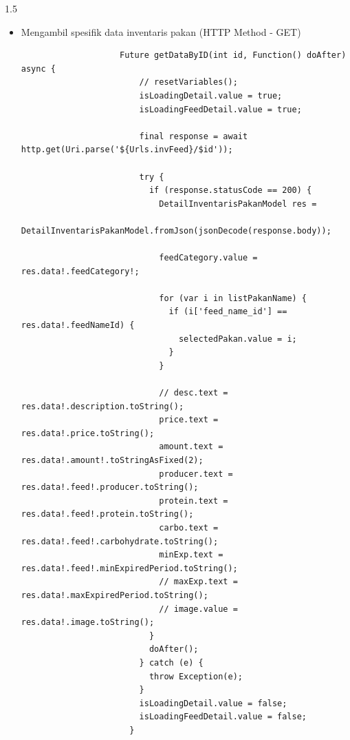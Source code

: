 \begin{spacing}{1.5}
\begin{enumerate}
\begin{enumerate}
\begin{itemize}
\begin{lstlisting}
						try {
						if (response.statusCode == 200) {
							InventarisPakanModel res =
								InventarisPakanModel.fromJson(jsonDecode(response.body));

							feedList.value = res;

							for (var i in feedList.value.data!) {
							selectedFeedList.add({
								'id': i.idInt,
								'feed_id': i.sId,
								'feed_name': i.brandName,
							});

							selectedFeedName.value = selectedFeedList[0];
							}

							inspect(feedList.value.data);

							doAfter();
						}
						} catch (e) {
						throw Exception(e);
						}
						isLoadingPage.value = false;
					}
				\end{lstlisting}

				\item Mengambil spesifik data inventaris pakan (HTTP Method - GET)
				
				\begin{lstlisting}
					Future getDataByID(int id, Function() doAfter) async {
						// resetVariables();
						isLoadingDetail.value = true;
						isLoadingFeedDetail.value = true;
					
						final response = await http.get(Uri.parse('${Urls.invFeed}/$id'));
					
						try {
						  if (response.statusCode == 200) {
							DetailInventarisPakanModel res =
								DetailInventarisPakanModel.fromJson(jsonDecode(response.body));
					
							feedCategory.value = res.data!.feedCategory!;
					
							for (var i in listPakanName) {
							  if (i['feed_name_id'] == res.data!.feedNameId) {
								selectedPakan.value = i;
							  }
							}
					
							// desc.text = res.data!.description.toString();
							price.text = res.data!.price.toString();
							amount.text = res.data!.amount!.toStringAsFixed(2);
							producer.text = res.data!.feed!.producer.toString();
							protein.text = res.data!.feed!.protein.toString();
							carbo.text = res.data!.feed!.carbohydrate.toString();
							minExp.text = res.data!.feed!.minExpiredPeriod.toString();
							// maxExp.text = res.data!.maxExpiredPeriod.toString();
							// image.value = res.data!.image.toString();
						  }
						  doAfter();
						} catch (e) {
						  throw Exception(e);
						}
						isLoadingDetail.value = false;
						isLoadingFeedDetail.value = false;
					  }
				\end{lstlisting}


\end{itemize}
\end{enumerate}
\end{enumerate}
\end{spacing}

